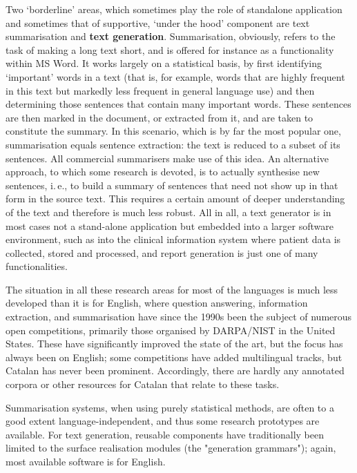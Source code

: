 \begin{multicols}{2}
Two ‘borderline’ areas, which sometimes play the role of standalone application and sometimes that of supportive, ‘under the hood’ component are text summarisation and \textbf{text generation}. Summarisation, obviously, refers to the task of making a long text short, and is offered for instance as a functionality within MS Word. It works largely on a statistical basis, by first identifying ‘important’ words in a text (that is, for example, words that are highly frequent in this text but markedly less frequent in general language use) and then determining those sentences that contain many important words. These sentences are then marked in the document, or extracted from it, and are taken to constitute the summary. In this scenario, which is by far the most popular one, summarisation equals sentence extraction: the text is reduced to a subset of its sentences. All commercial summarisers make use of this idea. An alternative approach, to which some research is devoted, is to actually synthesise new sentences, i.\,e., to build a summary of sentences that need not show up in that form in the source text. This requires a certain amount of deeper understanding of the text and therefore is much less robust. All in all, a text generator is in most cases not a stand-alone application but embedded into a larger software environment, such as into the clinical information system where patient data is collected, stored and processed, and report generation is just one of many functionalities.

The situation in all these research areas for most of the languages is much less developed than it is for English, where question answering, information extraction, and summarisation have since the 1990s been the subject of numerous open competitions, primarily those organised by DARPA/NIST in the United States. These have significantly improved the state of the art, but the focus has always been on English; some competitions have added multilingual tracks, but Catalan has never been prominent. Accordingly, there are hardly any annotated corpora or other resources for Catalan that relate to these tasks. 


Summarisation systems, when using purely statistical methods, are often to a good extent language-independent, and thus some research prototypes are available. For text generation, reusable components have traditionally been limited to the surface realisation modules (the "generation grammars"); again, most available software is for English.


\end{multicols}

